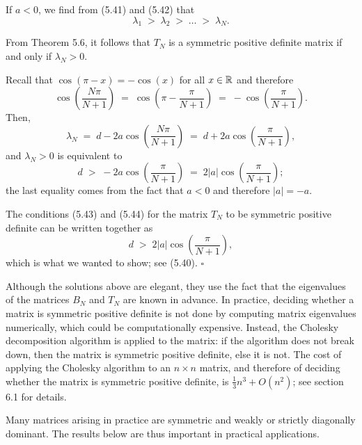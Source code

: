 
If $a < 0$, we find from (5.41) and (5.42) that
\[
\lambda_1 \;>\; \lambda_2 \;>\; \dots \;>\; \lambda_N.
\]

From Theorem 5.6, it follows that $T_N$ is a symmetric positive definite matrix if and
only if $\lambda_N > 0$.

Recall that $\cos(\pi - x) = -\cos(x)$ for all $x \in \mathbb{R}$ and therefore
\[
\cos\left(\frac{N\pi}{N+1}\right) \;=\; \cos\left(\pi - \frac{\pi}{N+1}\right) \;=\; -\cos\left(\frac{\pi}{N+1}\right).
\]
Then,
\[
\lambda_N \;=\; d - 2a\cos\left(\frac{N\pi}{N+1}\right) \;=\; d + 2a\cos\left(\frac{\pi}{N+1}\right),
\]
and $\lambda_N > 0$ is equivalent to
\begin{equation}
d \;>\; -2a\cos\left(\frac{\pi}{N+1}\right) \;=\; 2|a|\cos\left(\frac{\pi}{N+1}\right);
\end{equation}
the last equality comes from the fact that $a < 0$ and therefore $|a| = -a$.

The conditions (5.43) and (5.44) for the matrix $T_N$ to be symmetric positive definite
can be written together as
\[
d \;>\; 2|a|\cos\left(\frac{\pi}{N+1}\right),
\]
which is what we wanted to show; see (5.40).
\hfill$\square$
\par\medskip

Although the solutions above are elegant, they use the fact that the eigenvalues of the
matrices $B_N$ and $T_N$ are known in advance. In practice, deciding whether a matrix
is symmetric positive definite is not done by computing matrix eigenvalues
numerically, which could be computationally expensive. Instead, the Cholesky
decomposition algorithm is applied to the matrix: if the algorithm does not break down,
then the matrix is symmetric positive definite, else it is not. The cost of applying
the Cholesky algorithm to an $n \times n$ matrix, and therefore of deciding whether the
matrix is symmetric positive definite, is $\frac{1}{3}n^3 + O(n^2)$; see section 6.1
for details.

Many matrices arising in practice are symmetric and weakly or strictly diagonally
dominant. The results below are thus important in practical applications.

